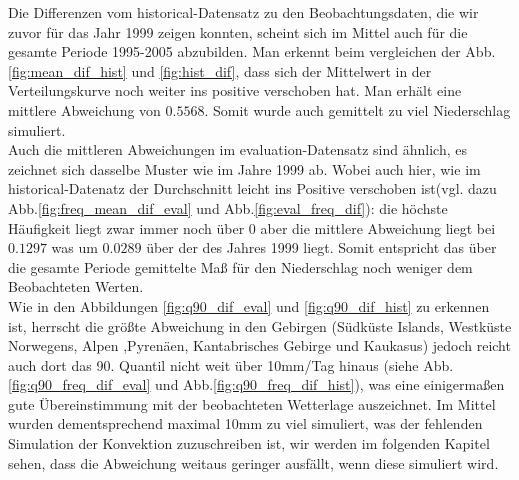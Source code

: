 Die Differenzen vom historical-Datensatz zu den Beobachtungsdaten, die wir zuvor für das Jahr 1999 zeigen konnten, scheint sich im Mittel auch für die gesamte Periode 1995-2005 abzubilden. Man erkennt beim vergleichen der Abb. \ref{fig:mean_dif_hist} und \ref{fig:hist_dif}, dass sich der Mittelwert in der Verteilungskurve noch weiter ins positive verschoben hat. Man erhält eine mittlere Abweichung von $0.5568$. Somit wurde auch gemittelt zu viel Niederschlag simuliert.\\
Auch die mittleren Abweichungen im evaluation-Datensatz sind ähnlich, es zeichnet sich dasselbe Muster wie im Jahre 1999 ab. Wobei auch hier, wie im historical-Datenatz der Durchschnitt leicht ins Positive verschoben ist(vgl. dazu Abb.\ref{fig:freq_mean_dif_eval} und Abb.\ref{fig:eval_freq_dif}): die höchste Häufigkeit liegt zwar immer noch über $0$ aber die mittlere Abweichung liegt bei $0.1297$ was um $0.0289$ über der des Jahres 1999 liegt. Somit entspricht das über die gesamte Periode gemittelte Maß für den Niederschlag noch weniger dem Beobachteten Werten.\\
Wie in den Abbildungen \ref{fig:q90_dif_eval} und \ref{fig:q90_dif_hist} zu erkennen ist, herrscht die größte Abweichung in den Gebirgen (Südküste Islands, Westküste Norwegens, Alpen ,Pyrenäen, Kantabrisches Gebirge und Kaukasus) jedoch reicht auch dort das 90. Quantil nicht weit über 10mm/Tag hinaus (siehe Abb.\ref{fig:q90_freq_dif_eval} und Abb.\ref{fig:q90_freq_dif_hist}), was eine einigermaßen gute Übereinstimmung mit der beobachteten Wetterlage auszeichnet. Im Mittel wurden dementsprechend maximal 10mm zu viel simuliert, was der fehlenden Simulation der Konvektion zuzuschreiben ist, wir werden im folgenden Kapitel sehen, dass die Abweichung weitaus geringer ausfällt, wenn diese simuliert wird.
